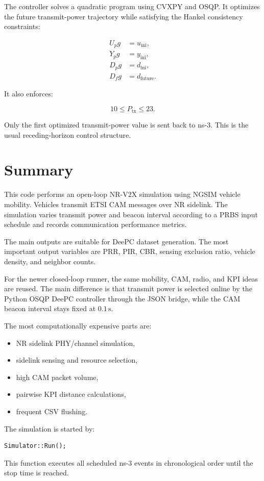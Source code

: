 \documentclass[11pt,a4paper]{article}
\begin{document}
The controller solves a quadratic program using CVXPY and OSQP. It optimizes the future transmit-power trajectory while satisfying the Hankel consistency constraints:

\begin{align}
U_p g &= u_{\mathrm{ini}}, \\
Y_p g &= y_{\mathrm{ini}}, \\
D_p g &= d_{\mathrm{ini}}, \\
D_f g &= d_{\mathrm{future}}.
\end{align}

It also enforces:

\begin{equation}
10 \leq P_{\mathrm{tx}} \leq 23.
\end{equation}

Only the first optimized transmit-power value is sent back to ns-3. This is the usual receding-horizon control structure.

\section{Summary}

This code performs an open-loop NR-V2X simulation using NGSIM vehicle mobility. Vehicles transmit ETSI CAM messages over NR sidelink. The simulation varies transmit power and beacon interval according to a PRBS input schedule and records communication performance metrics.

The main outputs are suitable for DeePC dataset generation. The most important output variables are PRR, PIR, CBR, sensing exclusion ratio, vehicle density, and neighbor counts.

For the newer closed-loop runner, the same mobility, CAM, radio, and KPI ideas are reused. The main difference is that transmit power is selected online by the Python OSQP DeePC controller through the JSON bridge, while the CAM beacon interval stays fixed at \(0.1\,\mathrm{s}\).

The most computationally expensive parts are:
\begin{itemize}
    \item NR sidelink PHY/channel simulation,
    \item sidelink sensing and resource selection,
    \item high CAM packet volume,
    \item pairwise KPI distance calculations,
    \item frequent CSV flushing.
\end{itemize}

The simulation is started by:

\begin{lstlisting}[style=cppstyle]
Simulator::Run();
\end{lstlisting}

This function executes all scheduled ns-3 events in chronological order until the stop time is reached.
\end{document}
